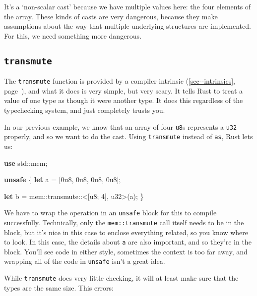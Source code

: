 \documentclass[a4paper,]{book}
\renewcommand*{\hyperref}[2][\ar]{%
  \def\ar{#2}%
  #2 (\autoref{#1}, page~\pageref{#1})}
\newenvironment{Shaded}{\begin{snugshade}}{\end{snugshade}}
\newcommand{\KeywordTok}[1]{\textcolor[rgb]{0.13,0.29,0.53}{\textbf{{#1}}}}
\newcommand{\DataTypeTok}[1]{\textcolor[rgb]{0.13,0.29,0.53}{{#1}}}
\newcommand{\DecValTok}[1]{\textcolor[rgb]{0.00,0.00,0.81}{{#1}}}
\newcommand{\NormalTok}[1]{{#1}}
\begin{document}
It's a `non-scalar cast' because we have multiple values here: the four
elements of the array. These kinds of casts are very dangerous, because
they make assumptions about the way that multiple underlying structures
are implemented. For this, we need something more dangerous.

\subsection{\texorpdfstring{\texttt{transmute}}{transmute}}\label{transmute}

The \texttt{transmute} function is provided by a
\hyperref[sec--intrinsics]{compiler intrinsic}, and what it does is very
simple, but very scary. It tells Rust to treat a value of one type as
though it were another type. It does this regardless of the typechecking
system, and just completely trusts you.

In our previous example, we know that an array of four \texttt{u8}s
represents a \texttt{u32} properly, and so we want to do the cast. Using
\texttt{transmute} instead of \texttt{as}, Rust lets us:

\begin{Shaded}
\begin{Highlighting}[]
\KeywordTok{use} \NormalTok{std::mem;}

\KeywordTok{unsafe} \NormalTok{\{}
    \KeywordTok{let} \NormalTok{a = [}\DecValTok{0u8}\NormalTok{, }\DecValTok{0u8}\NormalTok{, }\DecValTok{0u8}\NormalTok{, }\DecValTok{0u8}\NormalTok{];}

    \KeywordTok{let} \NormalTok{b = mem::transmute::<[}\DataTypeTok{u8}\NormalTok{; }\DecValTok{4}\NormalTok{], }\DataTypeTok{u32}\NormalTok{>(a);}
\NormalTok{\}}
\end{Highlighting}
\end{Shaded}

We have to wrap the operation in an \texttt{unsafe} block for this to
compile successfully. Technically, only the \texttt{mem::transmute} call
itself needs to be in the block, but it's nice in this case to enclose
everything related, so you know where to look. In this case, the details
about \texttt{a} are also important, and so they're in the block. You'll
see code in either style, sometimes the context is too far away, and
wrapping all of the code in \texttt{unsafe} isn't a great idea.

While \texttt{transmute} does very little checking, it will at least
make sure that the types are the same size. This errors:
\end{document}
